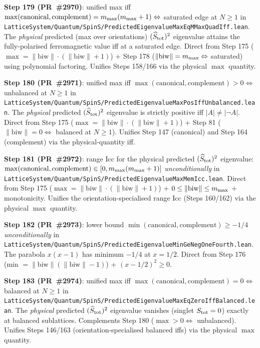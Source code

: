 \documentclass[a4paper,11pt]{article}
\begin{document}
\textbf{Step 179 (PR~\#2970)}: unified max iff
$\max(\mathrm{canonical}, \mathrm{complement}) = m_{\rm max}(m_{\rm max}+1)
\Leftrightarrow$ saturated edge at $N \ge 1$ in
\texttt{LatticeSystem/Quantum/SpinS/PredictedEigenvalueMaxEqMMaxQuadIff.lean}.
The \emph{physical} predicted (max over orientations) $(\widehat S_{\rm tot})^2$
eigenvalue attains the fully-polarised ferromagnetic value iff at a
saturated edge. Direct from Step 175 ($\max = \|\mathrm{biw}\|\cdot(\|\mathrm{biw}\|+1)$)
$+$ Step 178 ($\|\mathrm{biw}\| = m_{\rm max} \Leftrightarrow$ saturated)
using polynomial factoring. Unifies Steps 158/166 via the physical
$\max$ quantity.

\textbf{Step 180 (PR~\#2971)}: unified max iff
$\max(\mathrm{canonical}, \mathrm{complement}) > 0 \Leftrightarrow$
unbalanced at $N \ge 1$ in
\texttt{LatticeSystem/Quantum/SpinS/PredictedEigenvalueMaxPosIffUnbalanced.lean}.
The \emph{physical} predicted $(\widehat S_{\rm tot})^2$ eigenvalue is
strictly positive iff $|A| \ne |\neg A|$. Direct from Step 175
($\max = \|\mathrm{biw}\|\cdot(\|\mathrm{biw}\|+1)$) + Step 81
($\|\mathrm{biw}\| = 0 \Leftrightarrow$ balanced at $N \ge 1$). Unifies
Step 147 (canonical) and Step 164 (complement) via the
physical-quantity iff.

\textbf{Step 181 (PR~\#2972)}: range Icc for the physical predicted
$(\widehat S_{\rm tot})^2$ eigenvalue:
$\max(\mathrm{canonical}, \mathrm{complement}) \in [0, m_{\rm max}(m_{\rm max}+1)]$
\emph{unconditionally} in
\texttt{LatticeSystem/Quantum/SpinS/PredictedEigenvalueMaxMemIcc.lean}.
Direct from Step 175 ($\max = \|\mathrm{biw}\|\cdot(\|\mathrm{biw}\|+1)$)
+ $0 \le \|\mathrm{biw}\| \le m_{\rm max}$ + monotonicity. Unifies the
orientation-specialised range Icc (Steps 160/162) via the physical
$\max$ quantity.

\textbf{Step 182 (PR~\#2973)}: lower bound
$\min(\mathrm{canonical}, \mathrm{complement}) \ge -1/4$ \emph{unconditionally}
in
\texttt{LatticeSystem/Quantum/SpinS/PredictedEigenvalueMinGeNegOneFourth.lean}.
The parabola $x(x-1)$ has minimum $-1/4$ at $x = 1/2$. Direct from
Step 176 (min $= \|\mathrm{biw}\|(\|\mathrm{biw}\|-1)$) + $(x - 1/2)^2 \ge 0$.

\textbf{Step 183 (PR~\#2974)}: unified max iff
$\max(\mathrm{canonical}, \mathrm{complement}) = 0 \Leftrightarrow$ balanced
at $N \ge 1$ in
\texttt{LatticeSystem/Quantum/SpinS/PredictedEigenvalueMaxEqZeroIffBalanced.lean}.
The \emph{physical} predicted $(\widehat S_{\rm tot})^2$ eigenvalue vanishes
(singlet $S_{\rm tot} = 0$) exactly at balanced sublattices. Complements
Step 180 ($\max > 0 \Leftrightarrow$ unbalanced). Unifies Steps 146/163
(orientation-specialised balanced iffs) via the physical $\max$ quantity.
\end{document}
